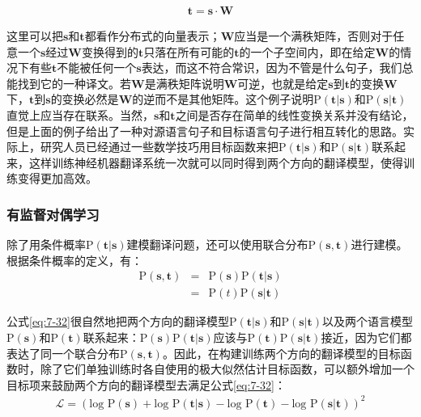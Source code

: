 \begin{eqnarray}
\mathbf t = \mathbf s \cdot \mathbf{W}
\label{eq:7-31}
\end{eqnarray}

\parinterval 这里可以把$\mathbf s$和$\mathbf t$都看作分布式的向量表示；$\mathbf{W}$应当是一个满秩矩阵，否则对于任意一个$\mathbf s$经过$\mathbf{W}$变换得到的$\mathbf t$只落在所有可能的$\mathbf t$的一个子空间内，即在给定$\mathbf{W}$的情况下有些$\mathbf t$不能被任何一个$\mathbf s$表达，而这不符合常识，因为不管是什么句子，我们总能找到它的一种译文。若$\mathbf{W}$是满秩矩阵说明$\mathbf{W}$可逆，也就是给定$\mathbf s$到$\mathbf t$的变换$\mathbf{W}$下，$\mathbf t$到$\mathbf s$的变换必然是$\mathbf{W}$的逆而不是其他矩阵。这个例子说明$\textrm{P}(\mathbf t|\mathbf s)$和$\textrm{P}(\mathbf s|\mathbf t)$直觉上应当存在联系。当然，$\mathbf s$和$\mathbf t$之间是否存在简单的线性变换关系并没有结论，但是上面的例子给出了一种对源语言句子和目标语言句子进行相互转化的思路。实际上，研究人员已经通过一些数学技巧用目标函数来把$\textrm{P}(\mathbf t|\mathbf s)$和$\textrm{P}(\mathbf s|\mathbf t)$联系起来，这样训练神经机器翻译系统一次就可以同时得到两个方向的翻译模型，使得训练变得更加高效\cite{Hassan2018AchievingHP}。


\subsubsection{有监督对偶学习}

\parinterval 除了用条件概率$\textrm{P}(\mathbf t|\mathbf s)$建模翻译问题，还可以使用联合分布$\textrm{P}(\mathbf s,\mathbf t)$进行建模\cite{DBLP:conf/icml/XiaQCBYL17}。根据条件概率的定义，有：
\begin{eqnarray}
\textrm{P}(\mathbf s,\mathbf t) &=& \textrm{P}(\mathbf s)\textrm{P}(\mathbf t|\mathbf s) \nonumber \\
&=& \textrm{P}(t)\textrm{P}(\mathbf s|\mathbf t)
\label{eq:7-32}
\end{eqnarray}

\parinterval 公式\ref{eq:7-32}很自然地把两个方向的翻译模型$\textrm{P}(\mathbf t|\mathbf s)$和$\textrm{P}(\mathbf s|\mathbf t)$以及两个语言模型$\textrm{P}(\mathbf s)$和$\textrm{P}(\mathbf t)$联系起来：$\textrm{P}(\mathbf s)\textrm{P}(\mathbf t|\mathbf s)$应该与$\textrm{P}(\mathbf t)\textrm{P}(\mathbf s|\mathbf t)$接近，因为它们都表达了同一个联合分布$\textrm{P}(\mathbf s,\mathbf t)$。因此，在构建训练两个方向的翻译模型的目标函数时，除了它们单独训练时各自使用的极大似然估计目标函数，可以额外增加一个目标项来鼓励两个方向的翻译模型去满足公式\ref{eq:7-32}：
\begin{eqnarray}
\mathcal{L} = (\textrm{log P}(\mathbf s) + \textrm{log P}(\mathbf t|\mathbf s) - \textrm{log P}(\mathbf t) - \textrm{log P}(\mathbf s|\mathbf t))^{2}
\label{eq:7-33}
\end{eqnarray}


